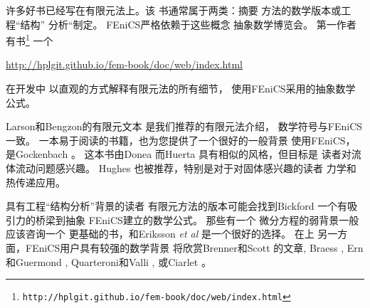 许多好书已经写在有限元法上。该
书通常属于两类：摘要
方法的数学版本或工程“结构”
分析“制定。 FEniCS严格依赖于这些概念
抽象数学博览会。 第一作者有书\footnote{\texttt{http://hplgit.github.io/fem-book/doc/web/index.html}}\cite{Langtangen_Mardal_FEM_2016}
一个
\begin{center}
  \url{http://hplgit.github.io/fem-book/doc/web/index.html}
\end{center}
在开发中
以直观的方式解释有限元法的所有细节，
使用FEniCS采用的抽象数学公式。

Larson和Bengzon的有限元文本 \cite{Larson_2013}
是我们推荐的有限元法介绍，
数学符号与FEniCS一致。
一本易于阅读的书籍，也为您提供了一个很好的一般背景
使用FEniCS，是Gockenbach \cite{Gockenbach2006}。 这本书由Donea
而Huerta \cite{DoneaHuerta2003}具有相似的风格，但目标是
读者对流体流动问题感兴趣。 Hughes \cite{Hughes1987}
也被推荐，特别是对于对固体感兴趣的读者
力学和热传递应用。

具有工程“结构分析”背景的读者
有限元方法的版本可能会找到Bickford
\cite{Bickford1994}一个有吸引力的桥梁到抽象
FEniCS建立的数学公式。 那些有一个
微分方程的弱背景一般应该咨询一个
更基础的书，和Eriksson \emph{et al}
\cite{ErikssonEstepHansboEtAl1996}是一个很好的选择。 在上
另一方面，FEniCS用户具有较强的数学背景
将欣赏Brenner和Scott \cite{BrennerScott2008}的文章, 
Braess \cite{Braess2007}, Ern和Guermond \cite{ErnGuermond2004}, 
Quarteroni和Valli \cite{QuarteroniValli1994}, 或Ciarlet
\cite{Ciarlet2002}。
